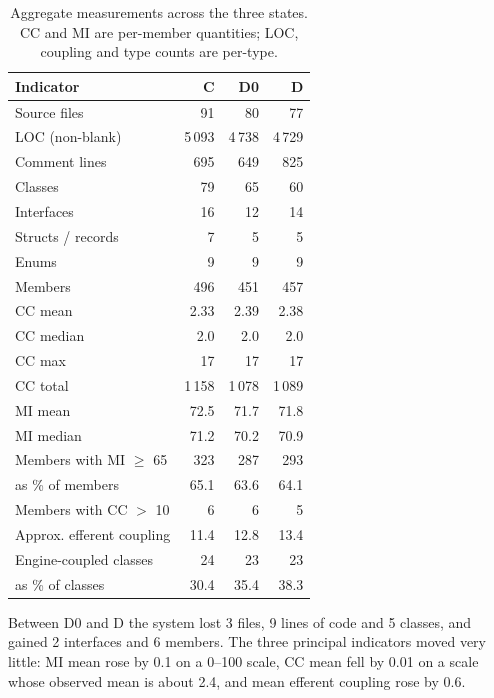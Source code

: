 \documentclass{sbc2019}%
\begin{document}
\begin{table}[!htbp]
\centering
\caption{Aggregate measurements across the three states. CC and MI are
per-member quantities; LOC, coupling and type counts are per-type.}\label{tab:aggregate}
\small
\begin{tabular}{lrrr}
\toprule
\textbf{Indicator} & \textbf{C} & \textbf{D0} & \textbf{D} \\
\midrule
Source files            & 91    & 80    & 77 \\
LOC (non-blank)         & 5\,093 & 4\,738 & 4\,729 \\
Comment lines           & 695   & 649   & 825 \\
Classes                 & 79    & 65    & 60 \\
Interfaces              & 16    & 12    & 14 \\
Structs / records       & 7     & 5     & 5 \\
Enums                   & 9     & 9     & 9 \\
Members                 & 496   & 451   & 457 \\
\addlinespace
CC mean                 & 2.33  & 2.39  & 2.38 \\
CC median               & 2.0   & 2.0   & 2.0 \\
CC max                  & 17    & 17    & 17 \\
CC total                & 1\,158 & 1\,078 & 1\,089 \\
\addlinespace
MI mean                 & 72.5  & 71.7  & 71.8 \\
MI median               & 71.2  & 70.2  & 70.9 \\
Members with MI $\geq$ 65 & 323 & 287   & 293 \\
\quad as \% of members   & 65.1  & 63.6  & 64.1 \\
Members with CC $>$ 10   & 6     & 6     & 5 \\
\addlinespace
Approx. efferent coupling & 11.4 & 12.8  & 13.4 \\
Engine-coupled classes  & 24    & 23    & 23 \\
\quad as \% of classes  & 30.4  & 35.4  & 38.3 \\
\bottomrule
\end{tabular}
\end{table}

Between D0 and D the system lost 3 files, 9 lines of code and 5 classes, and
gained 2 interfaces and 6 members. The three principal indicators moved very
little: MI mean rose by 0.1 on a 0--100 scale, CC mean fell by 0.01 on a scale
whose observed mean is about 2.4, and mean efferent coupling rose by 0.6.
\end{document}
